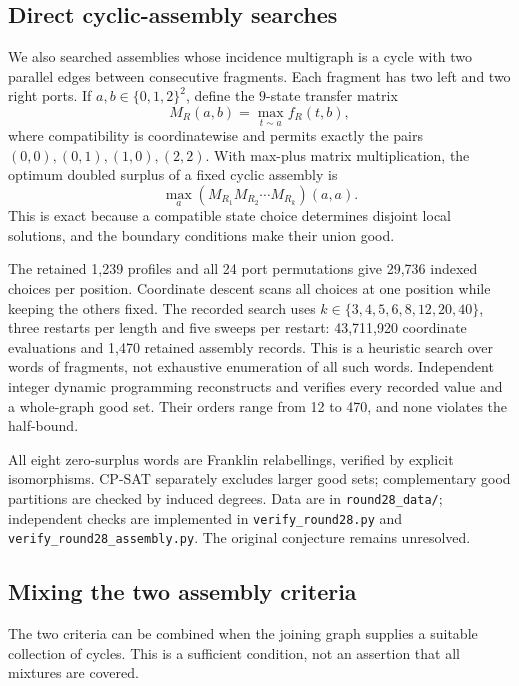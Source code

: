 \documentclass[11pt]{article}
\begin{document}
\subsection{Direct cyclic-assembly searches}
We also searched assemblies whose incidence multigraph is a cycle
with two parallel edges between consecutive fragments. Each fragment
has two left and two right ports. If $a,b\in\{0,1,2\}^2$, define
the $9$-state transfer matrix
\[
 M_R(a,b)=\max_{t\sim a} f_R(t,b),
\]
where compatibility is coordinatewise and permits exactly the pairs
$(0,0),(0,1),(1,0),(2,2)$. With max-plus matrix multiplication,
the optimum doubled surplus of a fixed cyclic assembly is
\[
 \max_a (M_{R_1}M_{R_2}\cdots M_{R_k})(a,a).
\]
This is exact because a compatible state choice determines disjoint
local solutions, and the boundary conditions make their union good.

The retained 1,239 profiles and all 24 port permutations give 29,736
indexed choices per position. Coordinate descent scans all choices
at one position while keeping the others fixed. The recorded search
uses $k\in\{3,4,5,6,8,12,20,40\}$, three restarts per length and
five sweeps per restart: 43,711,920 coordinate evaluations and
1,470 retained assembly records. This is a heuristic search over
words of fragments, not exhaustive enumeration of all such words.
Independent integer dynamic programming reconstructs and verifies
every recorded value and a whole-graph good set. Their orders range
from 12 to 470, and none violates the half-bound.

All eight zero-surplus words are Franklin relabellings, verified by
explicit isomorphisms. CP-SAT separately excludes larger good sets;
complementary good partitions are checked by induced degrees. Data
are in \texttt{round28\_data/}; independent checks are implemented in
\texttt{verify\_round28.py} and \texttt{verify\_round28\_assembly.py}.
The original conjecture remains unresolved.

\subsection{Mixing the two assembly criteria}
The two criteria can be combined when the joining graph supplies
a suitable collection of cycles. This is a sufficient condition,
not an assertion that all mixtures are covered.
\end{document}
